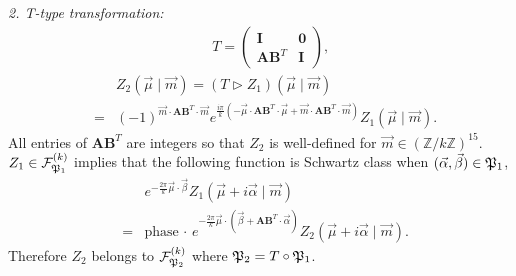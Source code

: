 \documentclass[aps,prd,notitlepage,nofootinbib,superscriptaddress,groupedaddress,twocolumn]{revtex4-1}
\def\be{\begin{eqnarray}}
\def\ee{\end{eqnarray}}
\newcommand{\cf}{\mathcal F}
\renewcommand{\a}{\alpha}
\renewcommand{\b}{\beta}
\newcommand{\act}{\rhd}
\begin{document}
\emph{2. T-type transformation:}
\be
&& T=\left(\begin{array}{cc}
\mathbf{I} & \mathbf{0} \\
\mathbf{A} \mathbf{B}^{T} & \mathbf{I}
\end{array}\right),
\ee
\be
&&Z_2(\vec{\mu}\mid \vec{m})=(T\act Z_1)(\vec{\mu}\mid \vec{m})\label{Ttrans}\\
&=&(-1)^{\vec{m} \cdot \mathbf{A} \mathbf{B}^{T} \cdot \vec{m}} e^{\frac{i \pi}{k}(-\vec{\mu} \cdot \mathbf{A} \mathbf{B}^{T} \cdot \vec{\mu}+\vec{m} \cdot \mathbf{A} \mathbf{B}^{T} \cdot \vec{m})}Z_1(\vec{\mu}\mid \vec{m}).\nonumber
\ee
All entries of $\mathbf{A} \mathbf{B}^{T}$ are integers so that $Z_2$ is well-defined for $\vec{m}\in (\mathbb{Z}/k\mathbb{Z})^{15}$. $Z_1\in \cf_{\Fp_1}^{(k)}$ implies that the following function is Schwartz class when $(\vec{\a},\vec{\b})\in\Fp_1 $,
\be
&&e^{-\frac{2\pi}{k}\vec{\mu}\cdot \vec{\b}}Z_1(\vec{\mu}+i\vec{\a}\mid \vec{m})\nonumber\\
&=&\text{phase}\, \cdot\, e^{-\frac{2\pi}{k}\vec{\mu}\cdot( \vec{\b}+ \mathbf{A} \mathbf{B}^{T}\cdot \vec{\a})}Z_2(\vec{\mu}+i\vec{\a}\mid \vec{m}).
\ee
Therefore $Z_2$ belongs to $\cf_{\Fp_2}^{(k)}$ where $\mathfrak{P}_2=T\circ \mathfrak{P}_1 $.\\
\end{document}
